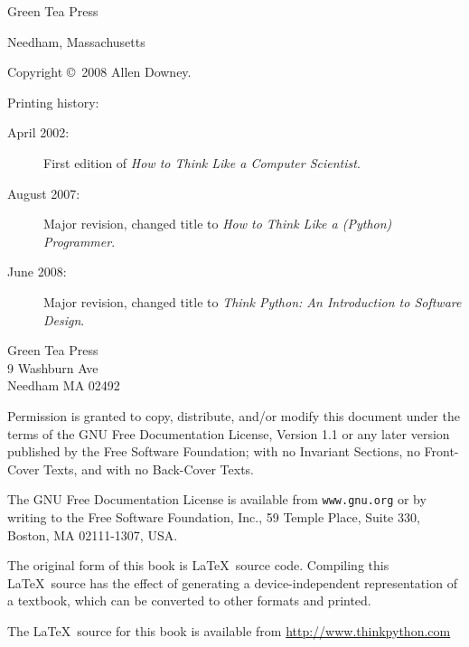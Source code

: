 \documentclass[10pt]{book}
\begin{document}
\begin{latexonly}
\begin{flushright}
\vspace{0.5in}

{\Large Green Tea Press}

{\small Needham, Massachusetts}

\vfill

\end{flushright}


\pagebreak
\thispagestyle{empty}

{\small
Copyright \copyright ~2008 Allen Downey.


Printing history:

\begin{description}

\item[April 2002:] First edition of {\em How to Think Like
a Computer Scientist}.

\item[August 2007:] Major revision, changed title to
{\em How to Think Like a (Python) Programmer}.

\item[June 2008:] Major revision, changed title to
{\em Think Python: An Introduction to Software Design}.

\end{description}

\vspace{0.2in}

\begin{flushleft}
Green Tea Press       \\
9 Washburn Ave \\
Needham MA 02492
\end{flushleft}

Permission is granted to copy, distribute, and/or modify this document
under the terms of the GNU Free Documentation License, Version 1.1 or
any later version published by the Free Software Foundation; with no
Invariant Sections, no Front-Cover Texts, and with no Back-Cover Texts.

The GNU Free Documentation License is available from {\tt www.gnu.org}
or by writing to the Free Software Foundation, Inc., 59 Temple Place,
Suite 330, Boston, MA 02111-1307, USA.

The original form of this book is \LaTeX\ source code.  Compiling this
\LaTeX\ source has the effect of generating a device-independent
representation of a textbook, which can be converted to other formats
and printed.

The \LaTeX\ source for this book is available from
\url{http://www.thinkpython.com}

\vspace{0.2in}

} %

\end{latexonly}
\end{document}
